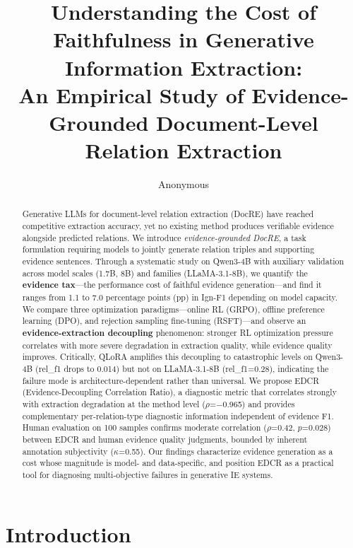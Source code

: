 \documentclass[11pt,a4paper]{article}
\title{Understanding the Cost of Faithfulness in Generative Information Extraction: \\
An Empirical Study of Evidence-Grounded Document-Level Relation Extraction}
\author{Anonymous}
\newcommand{\edcr}{EDCR}
\begin{document}
\maketitle

\begin{abstract}
Generative LLMs for document-level relation extraction (DocRE) have reached competitive extraction accuracy, yet no existing method produces verifiable evidence alongside predicted relations.
We introduce \emph{evidence-grounded DocRE}, a task formulation requiring models to jointly generate relation triples and supporting evidence sentences.
Through a systematic study on Qwen3-4B with auxiliary validation across model scales (1.7B, 8B) and families (LLaMA-3.1-8B), we quantify the \textbf{evidence tax}---the performance cost of faithful evidence generation---and find it ranges from 1.1 to 7.0 percentage points (pp) in Ign-F1 depending on model capacity.
We compare three optimization paradigms---online RL (GRPO), offline preference learning (DPO), and rejection sampling fine-tuning (RSFT)---and observe an \textbf{evidence-extraction decoupling} phenomenon: stronger RL optimization pressure correlates with more severe degradation in extraction quality, while evidence quality improves.
Critically, QLoRA amplifies this decoupling to catastrophic levels on Qwen3-4B (rel\_f1 drops to 0.014) but not on LLaMA-3.1-8B (rel\_f1=0.28), indicating the failure mode is architecture-dependent rather than universal.
We propose \edcr{} (Evidence-Decoupling Correlation Ratio), a diagnostic metric that correlates strongly with extraction degradation at the method level ($\rho$=$-$0.965) and provides complementary per-relation-type diagnostic information independent of evidence F1.
Human evaluation on 100 samples confirms moderate correlation ($\rho$=0.42, $p$=0.028) between \edcr{} and human evidence quality judgments, bounded by inherent annotation subjectivity ($\kappa$=0.55).
Our findings characterize evidence generation as a cost whose magnitude is model- and data-specific, and position \edcr{} as a practical tool for diagnosing multi-objective failures in generative IE systems.
\end{abstract}

\section{Introduction}
\label{sec:intro}
\end{document}
